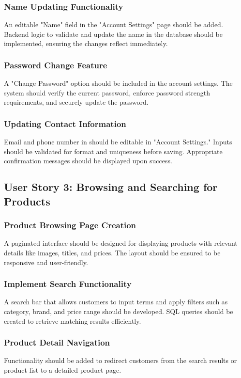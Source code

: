 \documentclass[a4paper,journal]{IEEEtran}
\begin{document}
\subsubsection{Name Updating Functionality}
An editable "Name" field in the "Account Settings" page should be added.
Backend logic to validate and update the name in the database should be
implemented, ensuring the changes reflect immediately.
\subsubsection{Password Change Feature}
A "Change Password" option should be included in the account settings.
The system should verify the current password, enforce password strength
requirements, and securely update the password.
\subsubsection{Updating Contact Information}
Email and phone number in should be editable in "Account Settings."
Inputs should be validated for format and uniqueness before saving.
Appropriate confirmation messages should be displayed upon success.

\subsection{User Story 3: Browsing and Searching for Products}
\subsubsection{Product Browsing Page Creation}
A paginated interface should be designed for displaying products with relevant
details like images, titles, and prices.
The layout should be ensured to be responsive and user-friendly.
\subsubsection{Implement Search Functionality}
A search bar that allows customers to input terms and apply filters
such as category, brand, and price range should be developed.
SQL queries should be created to retrieve matching results efficiently.
\subsubsection{Product Detail Navigation}
Functionality should be added to redirect customers from the search results or
product list to a detailed product page.
\end{document}
